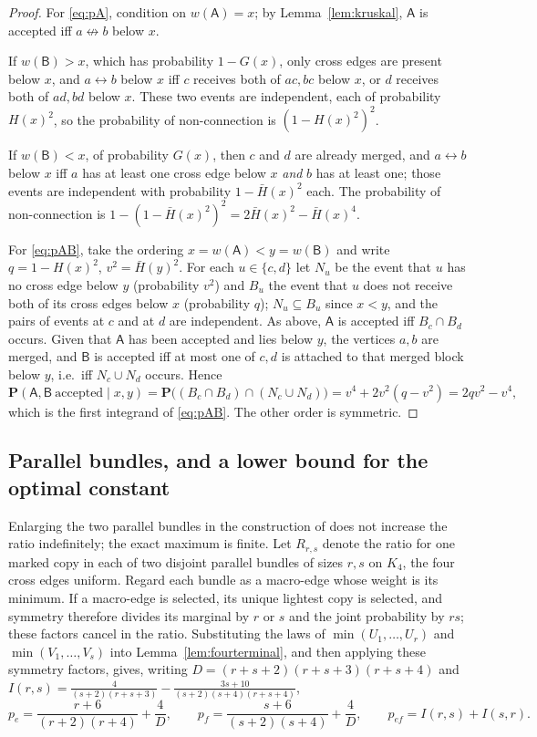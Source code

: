 \documentclass[11pt,a4paper]{amsart}
\theoremstyle{plain}
\theoremstyle{definition}
\theoremstyle{remark}
\newcommand{\PP}{\mathbf{P}}
\begin{document}
\begin{proof}
For \eqref{eq:pA}, condition on $w(\mathsf A)=x$; by Lemma~\ref{lem:kruskal},
$\mathsf A$ is accepted iff $a\not\leftrightarrow b$ below $x$.

If $w(\mathsf B)>x$, which has probability $1-G(x)$, only cross edges are
present below $x$, and $a\leftrightarrow b$ below $x$ iff $c$ receives both of
$ac,bc$ below $x$, or $d$ receives both of $ad,bd$ below $x$. These two events
are independent, each of probability $H(x)^2$, so the probability of
non-connection is $(1-H(x)^2)^2$.

If $w(\mathsf B)<x$, of probability $G(x)$, then $c$ and $d$ are already merged,
and $a\leftrightarrow b$ below $x$ iff $a$ has at least one cross edge below $x$
\emph{and} $b$ has at least one; those events are independent with probability
$1-\bar H(x)^2$ each. The probability of non-connection is
$1-(1-\bar H(x)^2)^2=2\bar H(x)^2-\bar H(x)^4$.

For \eqref{eq:pAB}, take the ordering $x=w(\mathsf A)<y=w(\mathsf B)$ and write
$q=1-H(x)^2$, $v^2=\bar H(y)^2$. For each $u\in\{c,d\}$ let $N_u$ be the event
that $u$ has no cross edge below $y$ (probability $v^2$) and $B_u$ the event
that $u$ does not receive both of its cross edges below $x$ (probability $q$);
$N_u\subseteq B_u$ since $x<y$, and the pairs of events at $c$ and at $d$ are
independent. As above, $\mathsf A$ is accepted iff $B_c\cap B_d$ occurs. Given
that $\mathsf A$ has been accepted and lies below $y$, the vertices $a,b$ are
merged, and $\mathsf B$ is accepted iff at most one of $c,d$ is attached to that
merged block below $y$, i.e.\ iff $N_c\cup N_d$ occurs. Hence
\[
\PP(\mathsf A,\mathsf B\ \text{accepted}\mid x,y)
=\PP\bigl((B_c\cap B_d)\cap(N_c\cup N_d)\bigr)
=v^4+2v^2(q-v^2)=2qv^2-v^4 ,
\]
which is the first integrand of \eqref{eq:pAB}. The other order is symmetric.
\end{proof}

\subsection{Parallel bundles, and a lower bound for the optimal constant}

Enlarging the two parallel bundles in the construction of \cite{LPS} does not
increase the ratio indefinitely; the exact maximum is finite. Let $R_{r,s}$
denote the ratio for one marked copy in
each of two disjoint parallel bundles of sizes $r,s$ on $K_4$, the four cross
edges uniform. Regard each bundle as a macro-edge whose weight is its minimum.
If a macro-edge is selected, its unique lightest copy is selected, and symmetry
therefore divides its marginal by $r$ or $s$ and the joint probability by
$rs$; these factors cancel in the ratio. Substituting the laws of
$\min(U_1,\dots,U_r)$ and $\min(V_1,\dots,V_s)$ into
Lemma~\ref{lem:fourterminal}, and then applying these symmetry factors, gives,
writing $D=(r+s+2)(r+s+3)(r+s+4)$ and
$I(r,s)=\frac4{(s+2)(r+s+3)}-\frac{3s+10}{(s+2)(s+4)(r+s+4)}$,
\[
p_e=\frac{r+6}{(r+2)(r+4)}+\frac4D,\qquad
p_f=\frac{s+6}{(s+2)(s+4)}+\frac4D,\qquad
p_{ef}=I(r,s)+I(s,r).
\]
\end{document}
